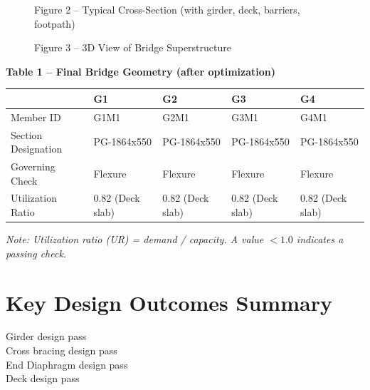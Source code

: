 \documentclass[12pt,a4paper]{report}
\numberwithin{table}{chapter}
\numberwithin{figure}{chapter}
\begin{document}
\newpage

\begin{figure}[H]
\centering
{}
\caption*{Figure 2 -- Typical Cross-Section (with girder, deck, barriers, footpath)}
\end{figure}

\begin{figure}[H]
\centering
{}
\caption*{Figure 3 -- 3D View of Bridge Superstructure}
\end{figure}

\noindent\textbf{Table 1 -- Final Bridge Geometry (after optimization)}

\vspace{0.4em}
\noindent
\begin{tabular}{|C{2.8cm}|C{3.0cm}|C{3.0cm}|C{3.0cm}|C{3.0cm}|}
\hline
  \textbf{} &
  \textbf{G1} &
  \textbf{G2} &
  \textbf{G3} &
  \textbf{G4} \\
\hline
Member ID & G1M1 & G2M1 & G3M1 & G4M1 \\
\hline
Section Designation & PG-1864x550 & PG-1864x550 & PG-1864x550 & PG-1864x550 \\
\hline
Governing Check & Flexure & Flexure & Flexure & Flexure \\
\hline
Utilization Ratio & 0.82 (Deck slab) & 0.82 (Deck slab) & 0.82 (Deck slab) & 0.82 (Deck slab) \\
\hline
\end{tabular}

\vspace{0.4em}
\noindent\textit{Note: Utilization ratio (UR) = demand / capacity. A value $< 1.0$ indicates a passing check.}

\vspace{1em}

\section*{Key Design Outcomes Summary}
\label{sec:key-outcomes}

\noindent Girder design pass \\
Cross bracing design pass \\
End Diaphragm design pass \\
Deck design pass
\end{document}
